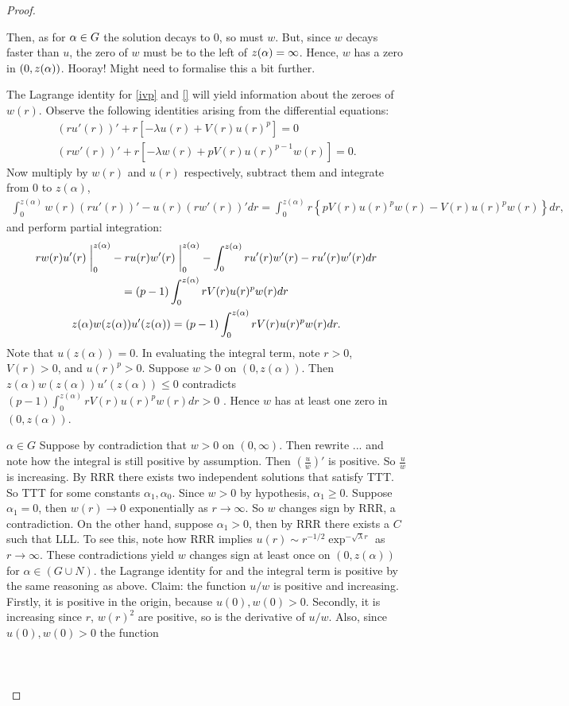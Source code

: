 \begin{lemma}
\begin{proof}
\begin{outline}
      \2 Then, as for $\alpha\in G$ the solution decays to 0, so must $w$.
      \2 But, since $w$ decays faster than $u$, the zero of $w$ must be to the left of $z(\alpha)=\infty$.
      \2 Hence, $w$ has a zero in $(0,z(\alpha))$.
        \3 Hooray!
    \1 Might need to formalise this a bit further.
  \end{outline}
The Lagrange identity for \ref{ivp} and \ref{} will yield information about the zeroes of $w(r)$. Observe the following identities arising from the differential equations:\begin{gather*}
(ru'(r))'+r\left[-\lambda u(r)+V(r)u(r)^p\right]=0\\
(rw'(r))'+r\left[-\lambda w(r)+pV(r)u(r)^{p-1}w(r)\right]=0.
\end{gather*} Now multiply by $w(r)$ and $u(r)$ respectively, subtract them and integrate from 0 to $z(\alpha)$, \begin{gather*}
\int_0^{z(\alpha)}w(r)(ru'(r))'-u(r)(rw'(r))'dr=%
\int_0^{z(\alpha)}r\left\{pV(r)u(r)^pw(r)-V(r)u(r)^pw(r)\right\}dr,
\end{gather*} and perform partial integration:\begin{gather*}
rw(r)u'(r)\at_0^{z(\alpha)}-ru(r)w'(r)\at_0^{z(\alpha)}-\int_0^{z(\alpha)}ru'(r)w'(r)-ru'(r)w'(r)dr\\=(p-1)\int_0^{z(\alpha)}rV(r)u(r)^pw(r)dr\\z(\alpha)w(z(\alpha))u'(z(\alpha))=(p-1)\int_0^{z(\alpha)}rV(r)u(r)^pw(r)dr.
\end{gather*} Note that $u(z(\alpha))=0$.   In evaluating the integral term, {\color{gray}note $r>0$, $V(r)>0$, and $u(r)^p>0$. Suppose $w>0$ on $(0,z(\alpha))$. Then $z(\alpha)w(z(\alpha))u'(z(\alpha))\leq0$ contradicts $(p-1)\int_0^{z(\alpha)}rV(r)u(r)^pw(r)dr>0$ \Lightning. Hence $w$ has at least one zero in $(0,z(\alpha))$.}

\underline{$\alpha\in G$} Suppose by contradiction that $w>0$ on $(0,\infty)$. {\color{gray} Then rewrite ... and note how the integral is still positive by assumption. Then $\left(\frac{u}{w}\right)'$ is positive. So $\frac{u}{w}$ is increasing. By RRR there exists two independent solutions that satisfy TTT. So TTT for some constants $\alpha_1,\alpha_0$. Since $w>0$ by hypothesis, $\alpha_1\geq0$. Suppose $\alpha_1=0$, then $w(r)\to0$ exponentially as $r\to\infty$. So $w$ changes sign by RRR, a contradiction. On the other hand, suppose $\alpha_1>0$, then by RRR there exists a $C$ such that LLL. To see this, note how RRR implies $u(r)\sim r^{-1/2}\exp^{-\sqrt{\lambda}r}$ as $r\to\infty$. These contradictions yield $w$ changes sign at least once on $(0,z(\alpha))$ for $\alpha\in(G\cup N)$.} the Lagrange identity for and the integral term is positive by the same reasoning as above. Claim: the function $u/w$ is positive and increasing. Firstly, it is positive in the origin, because $u(0),w(0)>0$. Secondly, it is increasing since $r$, $w(r)^2$ are positive, so is the derivative of $u/w$. Also, since $u(0),w(0)>0$ the function \\ \\
\underline{}\\ \\
\underline{}
\end{proof}
\end{lemma}
